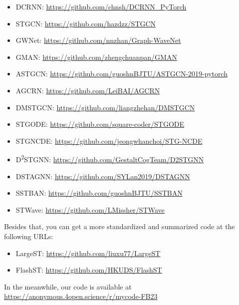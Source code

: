 




\begin{itemize}
    \item DCRNN: \url{https://github.com/chnsh/DCRNN_PyTorch}
    \item STGCN: \url{https://github.com/hazdzz/STGCN}
    \item GWNet: \url{https://github.com/nnzhan/Graph-WaveNet}
    \item GMAN: \url{https://github.com/zhengchuanpan/GMAN}
    \item ASTGCN: \url{https://github.com/guoshnBJTU/ASTGCN-2019-pytorch}
    \item AGCRN: \url{https://github.com/LeiBAI/AGCRN}
    \item DMSTGCN: \url{https://github.com/liangzhehan/DMSTGCN}
    \item STGODE: \url{https://github.com/square-coder/STGODE}
    \item STGNCDE: \url{https://github.com/jeongwhanchoi/STG-NCDE}
    \item D\textsuperscript{2}STGNN: \url{https://github.com/GestaltCogTeam/D2STGNN}
    \item DSTAGNN: \url{https://github.com/SYLan2019/DSTAGNN}
    \item SSTBAN: \url{https://github.com/guoshnBJTU/SSTBAN}
    \item STWave: \url{https://github.com/LMissher/STWave}
\end{itemize}
Besides that, you can get a more standardized and summarized code at the following URLs:
\begin{itemize}
    \item LargeST: \url{https://github.com/liuxu77/LargeST}
    \item FlashST: \url{https://github.com/HKUDS/FlashST}
\end{itemize}
In the meanwhile, our code is available at \url{https://anonymous.4open.science/r/mycode-FB23}

